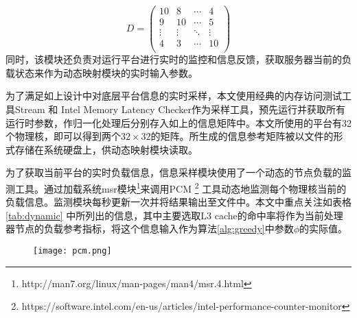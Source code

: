
$$
D =
\begin{pmatrix}
10      & 8      & \cdots & 4      \\
9      & 10      & \cdots & 5      \\
\vdots & \vdots & \ddots & \vdots \\
4      & 3      & \cdots & 10     \\
\end{pmatrix}
$$
同时，该模块还负责对运行平台进行实时的监控和信息反馈，获取服务器当前的负载状态来作为动态映射模块的实时输入参数。

为了满足如上设计中对底层平台信息的实时采样，本文使用经典的内存访问测试工具Stream 和 Intel Memory Latency Checker作为采样工具，预先运行并获取所有运行时参数，作归一化处理后分别存入如上的信息矩阵中。本文所使用的平台有32个物理核，即可以得到两个$32\times32$的矩阵。所生成的信息参考矩阵被以文件的形式存储在系统硬盘上，供动态映射模块读取。

为了获取当前平台的实时负载信息，信息采样模块使用了一个动态的节点负载的监测工具。通过加载系统msr模块\footnote{http://man7.org/linux/man-pages/man4/msr.4.html}来调用PCM \footnote{https://software.intel.com/en-us/articles/intel-performance-counter-monitor} 工具动态地监测每个物理核当前的负载信息。监测模块每秒更新一次并将结果输出至文件中。本文中重点关注如表格 \ref{tab:dynamic} 中所列出的信息，其中主要选取L3 cache的命中率将作为当前处理器节点的负载参考指标，将这个信息输入作为算法\ref{alg:greedy}中参数$\phi$的实际值。

\begin{figure}[!htp]
	\centering
	\texttt{[image: pcm.png]}
\end{figure}

